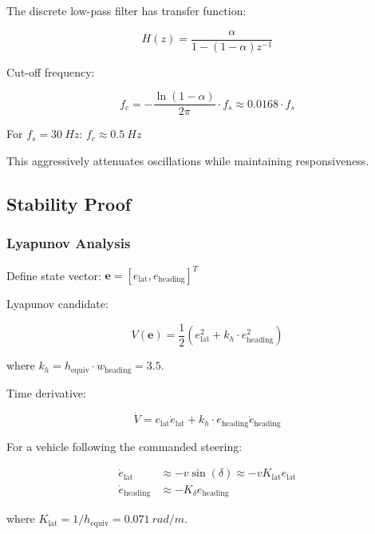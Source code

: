 \documentclass[11pt,a4paper]{article}
\begin{document}
The discrete low-pass filter has transfer function:

\begin{equation}
H(z) = \frac{\alpha}{1 - (1-\alpha)z^{-1}}
\end{equation}

Cut-off frequency:

\begin{equation}
f_c = -\frac{\ln(1-\alpha)}{2\pi} \cdot f_s \approx 0.0168 \cdot f_s
\end{equation}

For $f_s = \SI{30}{Hz}$: $f_c \approx \SI{0.5}{Hz}$

This aggressively attenuates oscillations while maintaining responsiveness.

\subsection{Stability Proof}

\subsubsection{Lyapunov Analysis}

Define state vector: $\mathbf{e} = [e_{\text{lat}}, e_{\text{heading}}]^T$

Lyapunov candidate:

\begin{equation}
V(\mathbf{e}) = \frac{1}{2}\left(e_{\text{lat}}^2 + k_h \cdot e_{\text{heading}}^2\right)
\end{equation}

where $k_h = h_{\text{equiv}} \cdot w_{\text{heading}} = 3.5$.

Time derivative:

\begin{equation}
\dot{V} = e_{\text{lat}} \dot{e}_{\text{lat}} + k_h \cdot e_{\text{heading}} \dot{e}_{\text{heading}}
\end{equation}

For a vehicle following the commanded steering:

\begin{align}
\dot{e}_{\text{lat}} &\approx -v \sin(\delta) \approx -v K_{\text{lat}} e_{\text{lat}} \\
\dot{e}_{\text{heading}} &\approx -K_\delta e_{\text{heading}}
\end{align}

where $K_{\text{lat}} = 1/h_{\text{equiv}} = \SI{0.071}{rad/m}$.
\end{document}
